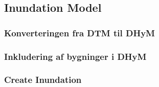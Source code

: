 \subsection{Inundation Model}

\subsubsection{Konverteringen fra DTM til DHyM}

\subsubsection{Inkludering af bygninger i DHyM}

\subsubsection{Create Inundation}

